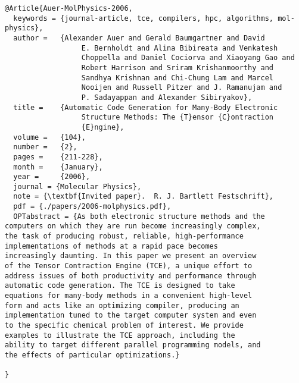 \documentclass[11pt]{article}
\begin{document}
\begin{lstlisting}
@Article{Auer-MolPhysics-2006,
  keywords = {journal-article, tce, compilers, hpc, algorithms, mol-physics},
  author = 	 {Alexander Auer and Gerald Baumgartner and David
                  E. Bernholdt and Alina Bibireata and Venkatesh
                  Choppella and Daniel Cociorva and Xiaoyang Gao and
                  Robert Harrison and Sriram Krishanmoorthy and
                  Sandhya Krishnan and Chi-Chung Lam and Marcel
                  Nooijen and Russell Pitzer and J. Ramanujam and
                  P. Sadayappan and Alexander Sibiryakov}, 
  title = 	 {Automatic Code Generation for Many-Body Electronic
                  Structure Methods: The {T}ensor {C}ontraction
                  {E}ngine},
  volume = 	 {104},
  number = 	 {2},
  pages = 	 {211-228},
  month = 	 {January},
  year =	 {2006},
  journal = {Molecular Physics},
  note = {\textbf{Invited paper}.  R. J. Bartlett Festschrift},
  pdf = {./papers/2006-molphysics.pdf},
  OPTabstract = {As both electronic structure methods and the
computers on which they are run become increasingly complex,
the task of producing robust, reliable, high-performance
implementations of methods at a rapid pace becomes
increasingly daunting. In this paper we present an overview
of the Tensor Contraction Engine (TCE), a unique effort to
address issues of both productivity and performance through
automatic code generation. The TCE is designed to take
equations for many-body methods in a convenient high-level
form and acts like an optimizing compiler, producing an
implementation tuned to the target computer system and even
to the specific chemical problem of interest. We provide
examples to illustrate the TCE approach, including the
ability to target different parallel programming models, and
the effects of particular optimizations.}

}

\end{lstlisting}
\end{document}
